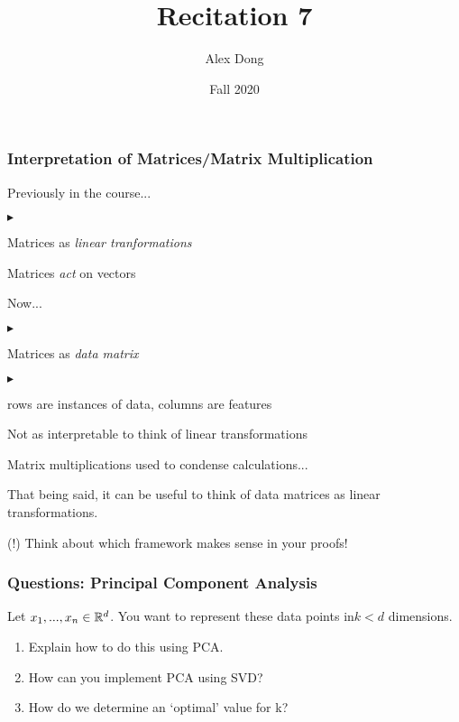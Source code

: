 \documentclass{beamer}
\title{Recitation 7}
\author{Alex Dong}
\institute{CDS, NYU}
\date{Fall 2020}
\renewenvironment{itemize}
\renewenvironment{enumerate}%
{\begin{list}{\arabic{enumi}.}%
      {\setlength{\leftmargin}{2.5em}%
       \setlength{\itemsep}{-\parsep}%
       \setlength{\topsep}{-\parskip}%
       \usecounter{enumi}}%
 }{\end{list}}
\renewenvironment{itemize}%
{\begin{list}{$\blacktriangleright$}%
      {\setlength{\leftmargin}{2.5em}%
       \setlength{\itemsep}{-\parsep}%
       \setlength{\topsep}{-\parskip}%
       \usecounter{enumi}}%
 }{\end{list}}
\begin{document}
\frame{\titlepage} 

\begin{frame}
\frametitle{Interpretation of Matrices/Matrix Multiplication}
Previously in the course...
\begin{itemize}
\item Matrices as \textit{linear tranformations}
\item Matrices \textit{act} on vectors
\end{itemize}
Now...
\begin{itemize}
\item Matrices as \textit{data matrix}
\begin{itemize}
\item rows are instances of data, columns are features
\end{itemize}
\item Not as interpretable to think of linear transformations
\item Matrix multiplications used to condense calculations...
\item That being said, it can be useful to think of data matrices as linear transformations.
\item (!) Think about which framework makes sense in your proofs!
\end{itemize}

\end{frame}



\begin{frame}
\frametitle{Questions: Principal Component Analysis}
Let $x_1,...,x_n\in\mathbb{R}^d$. You want to represent these data points in$ k < d$ dimensions.
\begin{enumerate}
\item Explain how to do this using PCA.
\item How can you implement PCA using SVD?
\item How do we determine an `optimal' value for k?
\end{enumerate}
\end{frame}
\end{document}

